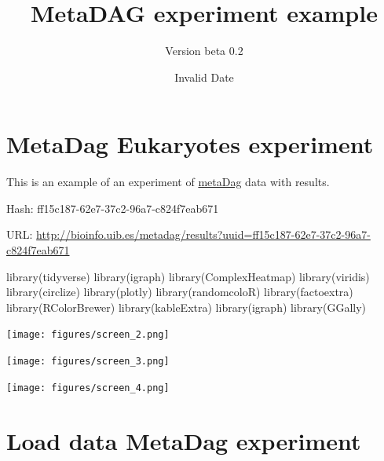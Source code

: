 \documentclass[
  letterpaper,
  DIV=11,
  numbers=noendperiod]{scrreprt}
\title{MetaDAG experiment example}
\author{Version beta 0.2}
\date{Invalid Date}
\newenvironment{Shaded}{\begin{snugshade}}{\end{snugshade}}
\newcommand{\FunctionTok}[1]{\textcolor[rgb]{0.28,0.35,0.67}{#1}}
\newcommand{\NormalTok}[1]{\textcolor[rgb]{0.00,0.23,0.31}{#1}}
\renewcommand*\contentsname{Table of contents}
\newcommand\contentsname{Table of contents}
\begin{document}
\maketitle
\renewcommand*\contentsname{Table of contents}
{
\hypersetup{linkcolor=}
\setcounter{tocdepth}{2}
\tableofcontents
}

\hypertarget{metadag-eukaryotes-experiment}{%
\chapter*{MetaDag Eukaryotes
experiment}\label{metadag-eukaryotes-experiment}}


This is an example of an experiment of
\href{https://http://bioinfo.uib.es/metadag/}{metaDag} data with
results.

Hash: ff15c187-62e7-37c2-96a7-c824f7eab671

URL:
\url{http://bioinfo.uib.es/metadag/results?uuid=ff15c187-62e7-37c2-96a7-c824f7eab671}

\begin{Shaded}
\begin{Highlighting}[]
\FunctionTok{library}\NormalTok{(tidyverse)}
\FunctionTok{library}\NormalTok{(igraph)}
\FunctionTok{library}\NormalTok{(ComplexHeatmap)}
\FunctionTok{library}\NormalTok{(viridis)}
\FunctionTok{library}\NormalTok{(circlize)}
\FunctionTok{library}\NormalTok{(plotly)}
\FunctionTok{library}\NormalTok{(randomcoloR)}
\FunctionTok{library}\NormalTok{(factoextra)}
\FunctionTok{library}\NormalTok{(RColorBrewer)}
\FunctionTok{library}\NormalTok{(kableExtra)}
\FunctionTok{library}\NormalTok{(igraph)}
\FunctionTok{library}\NormalTok{(GGally)}
\end{Highlighting}
\end{Shaded}

\texttt{[image: figures/screen\_2.png]}

\texttt{[image: figures/screen\_3.png]}

\texttt{[image: figures/screen\_4.png]}


\hypertarget{load-data-metadag-experiment}{%
\chapter*{Load data MetaDag
experiment}\label{load-data-metadag-experiment}}
\end{document}

